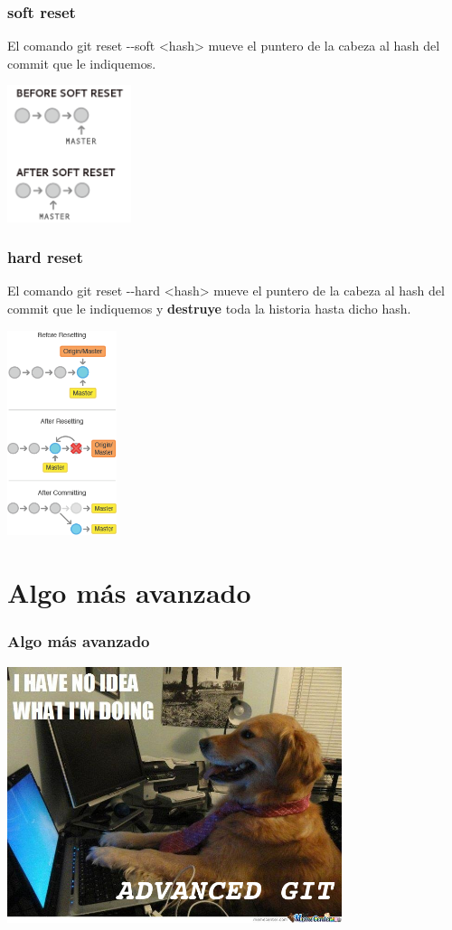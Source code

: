 \frame
{
\frametitle{soft reset}
 El comando git reset -{}-soft <hash> mueve el puntero de la cabeza al hash del commit que le indiquemos.\\
 \begin{center}
    \includegraphics[height=4cm]{imgs/soft-reset.png}
 \end{center}
}

\frame
{
\frametitle{hard reset}
 El comando git reset -{}-hard <hash> mueve el puntero de la cabeza al hash del commit que le indiquemos y \textbf{destruye} toda la historia hasta dicho hash.\\
 \begin{center}
    \includegraphics[height=6cm]{imgs/reset-hard.png}
 \end{center}
}

\section{Algo más avanzado}
\frame
{
\frametitle{Algo más avanzado}
\begin{center}
  \includegraphics[height=7.5cm]{imgs/noidea.jpg}
\end{center}
}

